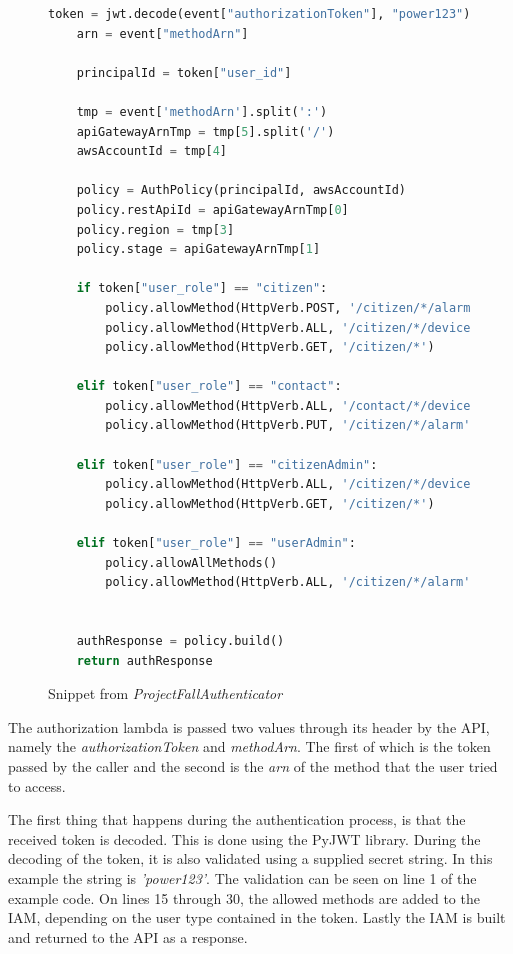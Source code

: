 \begin{figure}[H]
    \centering
    \begin{lstlisting}[language=Python]
    token = jwt.decode(event["authorizationToken"], "power123")
    arn = event["methodArn"]
    
    principalId = token["user_id"]

    tmp = event['methodArn'].split(':')
    apiGatewayArnTmp = tmp[5].split('/')
    awsAccountId = tmp[4]

    policy = AuthPolicy(principalId, awsAccountId)
    policy.restApiId = apiGatewayArnTmp[0]
    policy.region = tmp[3]
    policy.stage = apiGatewayArnTmp[1]
    
    if token["user_role"] == "citizen":
        policy.allowMethod(HttpVerb.POST, '/citizen/*/alarm')
        policy.allowMethod(HttpVerb.ALL, '/citizen/*/device')
        policy.allowMethod(HttpVerb.GET, '/citizen/*')
        
    elif token["user_role"] == "contact":
        policy.allowMethod(HttpVerb.ALL, '/contact/*/device')
        policy.allowMethod(HttpVerb.PUT, '/citizen/*/alarm')
        
    elif token["user_role"] == "citizenAdmin":
        policy.allowMethod(HttpVerb.ALL, '/citizen/*/device')
        policy.allowMethod(HttpVerb.GET, '/citizen/*')
        
    elif token["user_role"] == "userAdmin":
        policy.allowAllMethods()
        policy.allowMethod(HttpVerb.ALL, '/citizen/*/alarm')
    
    
    authResponse = policy.build()
    return authResponse
\end{lstlisting}
    \caption{Snippet from \textit{ProjectFallAuthenticator}}
    \label{fig:iam-auth}
\end{figure}

The authorization lambda is passed two values through its header by the API, namely the \textit{authorizationToken} and \textit{methodArn}. The first of which is the token passed by the caller and the second is the \textit{arn} of the method that the user tried to access.

The first thing that happens during the authentication process, is that the received token is decoded. This is done using the PyJWT library. During the decoding of the token, it is also validated using a supplied secret string. In this example the string is \textit{'power123'}. The validation can be seen on line 1 of the example code. On lines 15 through 30, the allowed methods are added to the IAM, depending on the user type contained in the token. Lastly the IAM is built and returned to the API as a response.

